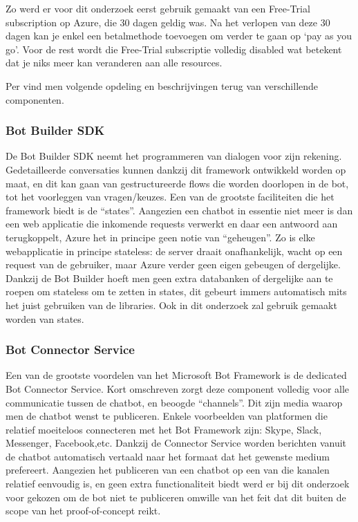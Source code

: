 Zo werd er voor dit onderzoek eerst gebruik gemaakt van een Free-Trial subscription op Azure, die 30 dagen geldig was. Na het verlopen van deze 30 dagen kan je enkel een betalmethode toevoegen om verder te gaan op `pay as you go'. Voor de rest wordt die Free-Trial subscriptie volledig disabled wat betekent dat je niks meer kan veranderen aan alle resources.


Per \textcite{delta-n2019} vind men volgende opdeling en beschrijvingen terug van verschillende componenten.
\subsubsection{Bot Builder SDK}
De Bot Builder SDK neemt het programmeren van dialogen voor zijn rekening. Gedetailleerde conversaties kunnen dankzij dit framework ontwikkeld worden op maat, en dit kan gaan van gestructureerde flows die worden doorlopen in de bot, tot het voorleggen van vragen/keuzes. Een van de grootste faciliteiten die het framework biedt is de “states”. Aangezien een chatbot in essentie niet meer is dan een web applicatie die inkomende requests verwerkt en daar een antwoord aan terugkoppelt, Azure het in principe geen notie van “geheugen”. Zo is elke webapplicatie in principe stateless: de server draait onafhankelijk, wacht op een request van de gebruiker, maar Azure verder geen eigen gebeugen of dergelijke. Dankzij de Bot Builder hoeft men geen extra databanken of dergelijke aan te roepen om stateless om te zetten in states, dit gebeurt immers automatisch mits het juist gebruiken van de libraries. Ook in dit onderzoek zal gebruik gemaakt worden van states. 

\subsubsection{Bot Connector Service}
Een van de grootste voordelen van het Microsoft Bot Framework is de dedicated Bot Connector Service. Kort omschreven zorgt deze component volledig voor alle communicatie tussen de chatbot, en beoogde “channels”. Dit zijn media waarop men de chatbot wenst te publiceren. Enkele voorbeelden van platformen die relatief moeiteloos connecteren met het Bot Framework zijn: Skype, Slack, Messenger, Facebook,etc. Dankzij de Connector Service worden berichten vanuit de chatbot automatisch vertaald naar het formaat dat het gewenste medium prefereert. Aangezien het publiceren van een chatbot op een van die kanalen relatief eenvoudig is, en geen extra functionaliteit biedt werd er bij dit onderzoek voor gekozen om de bot niet te publiceren omwille van het feit dat dit buiten de scope van het proof-of-concept reikt. 

